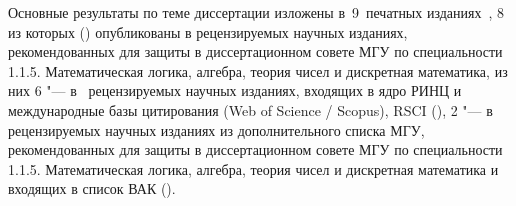 \else
{\publications} Основные результаты по теме диссертации изложены в~9~печатных изданиях~\cite{pdm20, dm21, fpe22, galatenko2023proper, galatenko23, fpm23, intsys20, tsar24, sibecrypt23},
8 из которых (\cite{pdm20, dm21, fpe22, galatenko2023proper, galatenko23, fpm23, intsys20, tsar24}) опубликованы в рецензируемых научных изданиях, рекомендованных для защиты в диссертационном совете МГУ по специальности 1.1.5. Математическая логика, алгебра, теория чисел и дискретная математика, из них 6 "--- в~ рецензируемых научных изданиях, входящих в ядро РИНЦ и международные базы цитирования (Web of Science / Scopus), RSCI (\cite{pdm20, dm21, fpe22, galatenko2023proper, galatenko23, fpm23}), 2 "--- в~ рецензируемых научных изданиях из дополнительного списка МГУ, рекомендованных для защиты в диссертационном совете МГУ по специальности 1.1.5. Математическая логика, алгебра, теория чисел и дискретная математика и входящих в список ВАК (\cite{intsys20, tsar24}).
\fi
